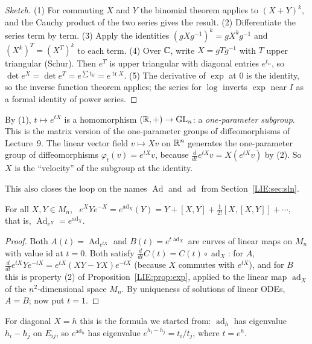 \begin{proof}[Sketch]
(1) For commuting $X$ and $Y$ the binomial theorem applies to $(X+Y)^k$, and the Cauchy product of the
two series gives the result. (2) Differentiate the series term by term. (3) Apply the identities
$(gXg^{-1})^k=gX^kg^{-1}$ and $(X^k)^T=(X^T)^k$ to each term. (4) Over $\mathbb{C}$, write $X=gTg^{-1}$ with
$T$ upper triangular (Schur). Then $e^T$ is upper triangular with diagonal entries $e^{t_{ii}}$, so
$\det e^X=\det e^T=e^{\sum t_{ii}}=e^{\operatorname{tr}X}$. (5) The derivative of $\exp$ at $0$ is the
identity, so the inverse function theorem applies; the series for $\log$ inverts $\exp$ near $I$ as a
formal identity of power series.
\end{proof}

By (1), $t\mapsto e^{tX}$ is a homomorphism $(\mathbb{R},+)\to\mathrm{GL}_n$: a \emph{one-parameter subgroup}. This is
the matrix version of the one-parameter groups of diffeomorphisms of Lecture~9. The linear vector field $v\mapsto Xv$ on $\mathbb{R}^n$ generates the
one-parameter group of diffeomorphisms $\varphi_t(v)=e^{tX}v$, because $\frac{d}{dt}e^{tX}v=X(e^{tX}v)$
by (2). So $X$ is the ``velocity'' of the subgroup at the identity.

This also closes the loop on the names $\operatorname{Ad}$ and $\operatorname{ad}$ from
Section~\ref{LIE:sec:sln}.

\begin{proposition}\label{LIE:prop:Adad}
For all $X,Y\in M_n$, \ $e^{X}Ye^{-X}=e^{\operatorname{ad}_X}(Y)=Y+[X,Y]+\tfrac1{2!}[X,[X,Y]]+\cdots$,
that is, $\operatorname{Ad}_{e^X}=e^{\operatorname{ad}_X}$.
\end{proposition}

\begin{proof}
Both $A(t)=\operatorname{Ad}_{e^{tX}}$ and $B(t)=e^{t\operatorname{ad}_X}$ are curves of linear maps on $M_n$
with value $\mathrm{id}$ at $t=0$. Both satisfy $\frac{d}{dt}C(t)=C(t)\circ\operatorname{ad}_X$: for $A$,
$\frac{d}{dt}e^{tX}Ye^{-tX}=e^{tX}(XY-YX)e^{-tX}$ (because $X$ commutes with $e^{tX}$), and for $B$ this
is property (2) of Proposition~\ref{LIE:prop:exp}, applied to the linear map $\operatorname{ad}_X$ of the
$n^2$-dimensional space $M_n$. By uniqueness of solutions of linear ODEs, $A=B$; now put $t=1$.
\end{proof}

For diagonal $X=h$ this is the formula we started from: $\operatorname{ad}_h$ has eigenvalue $h_i-h_j$
on $E_{ij}$, so $e^{\operatorname{ad}_h}$ has eigenvalue $e^{h_i-h_j}=t_i/t_j$, where $t=e^h$.

